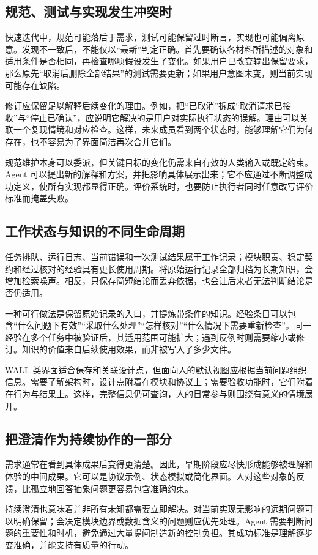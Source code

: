 \subsection{规范、测试与实现发生冲突时}
快速迭代中，规范可能落后于需求，测试可能保留过时断言，实现也可能偏离原意。发现不一致后，不能仅以“最新”判定正确。首先要确认各材料所描述的对象和适用条件是否相同，再检查哪项假设发生了变化。如果用户已改变输出保留要求，那么原先“取消后删除全部结果”的测试需要更新；如果用户意图未变，则当前实现可能存在缺陷。

修订应保留足以解释后续变化的理由。例如，把“已取消”拆成“取消请求已接收”与“停止已确认”，应说明它解决的是用户对实际执行状态的误解。理由可以关联一个复现情境和对应检查。这样，未来成员看到两个状态时，能够理解它们为何存在，也不容易为了界面简洁再次合并它们。

规范维护本身可以委派，但关键目标的变化仍需来自有效的人类输入或既定约束。Agent 可以提出新的解释和方案，并把影响具体展示出来；它不应通过不断调整成功定义，使所有实现都显得正确。评价系统时，也要防止执行者同时任意改写评价标准而掩盖失败。

\subsection{工作状态与知识的不同生命周期}
任务排队、运行日志、当前错误和一次测试结果属于工作记录；模块职责、稳定契约和经过核对的经验具有更长使用周期。将原始运行记录全部归档为长期知识，会增加检索噪声。相反，只保存简短结论而丢弃依据，也会让后来者无法判断结论是否仍适用。

一种可行做法是保留原始记录的入口，并提炼带条件的知识。经验条目可以包含“什么问题下有效”“采取什么处理”“怎样核对”“什么情况下需要重新检查”。同一经验在多个任务中被验证后，其适用范围可能扩大；遇到反例时则需要缩小或修订。知识的价值来自后续使用效果，而非被写入了多少文件。

WALL 类界面适合保存和关联设计点，但面向人的默认视图应根据当前问题组织信息。需要了解架构时，设计点附着在模块和协议上；需要验收功能时，它们附着在行为与结果上。这样，完整信息仍可查询，人的日常参与则围绕有意义的情境展开。

\subsection{把澄清作为持续协作的一部分}
需求通常在看到具体成果后变得更清楚。因此，早期阶段应尽快形成能够被理解和体验的中间成果。它可以是协议示例、状态模拟或简化界面。人对这些对象的反馈，比孤立地回答抽象问题更容易包含准确约束。

持续澄清也意味着并非所有未知都需要立即解决。对当前实现无影响的远期问题可以明确保留；会决定模块边界或数据含义的问题则应优先处理。Agent 需要判断问题的重要性和时机，避免通过大量提问制造新的控制负担。其成功标准是理解逐步变准确，并能支持有质量的行动。
